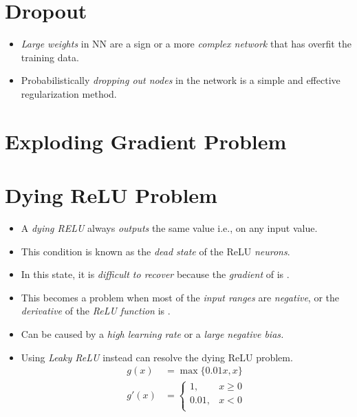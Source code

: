 \documentclass[
	number={8},
	title={Artificial Neural Network}
]{cs584notes}
\begin{document}
\section{Dropout}\label{sec:dropout}
\begin{itemize}
	\item \emph{Large weights} in NN are a sign or a more \emph{complex network} that has overfit the training data.
	\item Probabilistically \emph{dropping out nodes} in the network is a simple and effective regularization method.
\end{itemize}

\section{Exploding Gradient Problem}\label{sec:exploding-gradient-problem}

\section{Dying ReLU Problem}\label{sec:dying-relu-problem}
\begin{itemize}
	\item A \emph{dying RELU} always \emph{outputs} the same value i.e.,  on any input value.
	\item This condition is known as the \emph{dead state} of the ReLU \emph{neurons}.
	\item In this state, it is \emph{difficult to recover} because the \emph{gradient} of  is .
	\item This becomes a problem when most of the \emph{input ranges} are \emph{negative}, or the \emph{derivative} of the \emph{ReLU function} is .
	\item Can be caused by a \emph{high learning rate} or a \emph{large negative bias.}
	\item Using \emph{Leaky ReLU} instead can resolve the dying ReLU problem.
	\begin{equation}
		\begin{aligned}
			g(x) &= \max\{ 0.01x, x\}\\
			g'(x) &= \left\{ \begin{array}{ll}
				1, & x \geq 0\\
				0.01, & x < 0\\
			\end{array} \right.
		\end{aligned}
		\label{eq:leaky-relu}
	\end{equation}
\end{itemize}
\end{document}
